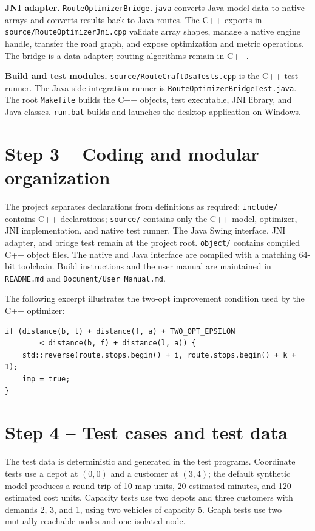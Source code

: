 \documentclass[11pt,a4paper]{article}
\begin{document}
\textbf{JNI adapter.}
\texttt{RouteOptimizerBridge.java} converts Java model data to native
arrays and converts results back to Java routes. The C++ exports in
\texttt{source/RouteOptimizerJni.cpp} validate array shapes, manage a native
engine handle, transfer the road graph, and expose optimization and metric
operations. The bridge is a data adapter; routing algorithms remain in C++.

\textbf{Build and test modules.}
\texttt{source/RouteCraftDsaTests.cpp} is the C++ test runner. The Java-side
integration runner is \texttt{RouteOptimizerBridgeTest.java}. The root
\texttt{Makefile} builds the C++ objects, test executable, JNI library, and
Java classes. \texttt{run.bat} builds and launches the desktop application on
Windows.

\section{Step 3 -- Coding and modular organization}

The project separates declarations from definitions as required:
\texttt{include/} contains C++ declarations; \texttt{source/} contains only
the C++ model, optimizer, JNI implementation, and native test runner. The
Java Swing interface, JNI adapter, and bridge test remain at the project
root. \texttt{object/} contains compiled C++ object files. The native and
Java interface are compiled with a matching 64-bit toolchain. Build
instructions and the user manual are maintained in \texttt{README.md} and
\texttt{Document/User\_Manual.md}.

The following excerpt illustrates the two-opt improvement condition used by
the C++ optimizer:

\begin{lstlisting}
if (distance(b, l) + distance(f, a) + TWO_OPT_EPSILON
        < distance(b, f) + distance(l, a)) {
    std::reverse(route.stops.begin() + i, route.stops.begin() + k + 1);
    imp = true;
}
\end{lstlisting}

\section{Step 4 -- Test cases and test data}

The test data is deterministic and generated in the test programs. Coordinate
tests use a depot at $(0,0)$ and a customer at $(3,4)$; the default synthetic
model produces a round trip of 10 map units, 20 estimated minutes, and 120
estimated cost units. Capacity tests use two depots and three customers with
demands 2, 3, and 1, using two vehicles of capacity 5. Graph tests use two
mutually reachable nodes and one isolated node.
\end{document}
